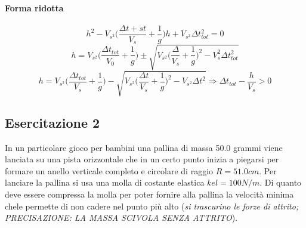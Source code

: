 \paragraph{Forma ridotta\label{forma ridotta es.1.1}}
\begin{equation*}
	h^2-V_{s^2}\bigg(\frac{\Delta t+st}{V_s}+\frac{1}{g}\bigg)h+V_{s^2}\Delta t_{tot}^2=0
\end{equation*}
\begin{equation*}
	h=V_{s^2}\bigg(\frac{\Delta t_{tot}}{V_0}+\frac{1}{g}\bigg)\pm \sqrt{V_{s^2}\bigg(\frac{\Delta}{V_s}+\frac{1}{g}\bigg)^2-V^2_s\Delta t^2_{tot}}
\end{equation*}
\begin{equation*}
	h=V_{s^2}\bigg(\frac{\Delta t_{tot}}{V_s}+\frac{1}{g}\bigg)-\sqrt{V_{s^2}\bigg(\frac{\Delta t}{V_s}+\frac{1}{g}\bigg)^2-V_{s^2}\Delta t^2}\Rightarrow \Delta t_{tot}-\frac{h}{V_s}>0
\end{equation*}
\subsection{Esercitazione 2}
In un particolare gioco per bambini una pallina di massa 50.0 grammi viene lanciata su una pista orizzontale   che   in   un   certo   punto   inizia   a   piegarsi   per   formare   un   anello   verticale   completo  e circolare di raggio $R= 51.0 cm$.  Per lanciare la pallina si usa una molla di costante elastica $kel=100N/m$. Di quanto deve essere compressa la molla per poter fornire alla pallina la velocità  minima chele permette di non cadere nel punto più alto (\textit{si trascurino le forze di attrito; PRECISAZIONE: LA MASSA SCIVOLA SENZA ATTRITO}). 
